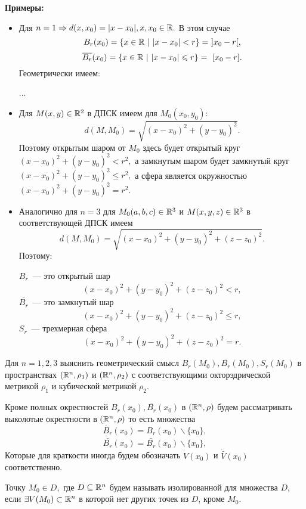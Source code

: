 \documentclass[../main.tex]{subfiles}
\begin{document}
	\textbf{Примеры:}
	\begin{itemize}
	\item Для $n = 1 \Rightarrow d(x, x_0) = |x - x_0|, x, x_0 \in \mathbb{R}.$ В этом случае 
	$$
		B_r(x_0) = \{x \in \mathbb{R}\ |\ |x - x_0| < r\} =\ ] x_0 - r [,
	$$
	$$
		\overline{B_r}(x_0) = \{x \in \mathbb{R}\ |\ |x - x_0| \leqslant r\} =\ [ x_0 - r ].
	$$
	Геометрически имеем:
	
	...
	
	\item  Для $M(x, y) \in \mathbb{R}^2$ в ДПСК имеем для $M_0(x_0, y_0)$:
	$$
		d(M, M_0) = \sqrt{(x - x_0)^2 + (y - y_0)^2}.
	$$
	Поэтому открытым шаром от $M_0$ здесь будет открытый круг 
	$
		(x - x_0)^2 + (y - y_0)^2 < r^2,
	$ 
	а замкнутым шаром будет замкнутый круг 
	$
		(x - x_0)^2 + (y - y_0)^2 \leqslant r^2,
	$ 
	а сфера является окружностью 
	$
		(x - x_0)^2 + (y - y_0)^2 = r^2.
	$ 
	
	\item Аналогично для $n = 3$ для $M_0(a, b, c) \in \mathbb{R}^3$ и $M(x, y, z) \in \mathbb{R}^3$ в соответствующей ДПСК имеем  
	$$
		d(M, M_0) = \sqrt{(x - x_0)^2 + (y - y_0)^2 + (z - z_0)^2}.
	$$
	Поэтому:
	
	$B_r$~--- это открытый шар
	$$
		(x - x_0)^2 + (y - y_0)^2 + (z - z_0)^2 < r,
	$$
	$\overline{B_r}$~--- это замкнутый шар
	$$
	(x - x_0)^2 + (y - y_0)^2 + (z - z_0)^2 \leqslant r,
	$$	
	$S_r$~--- трехмерная сфера
	$$
	(x - x_0)^2 + (y - y_0)^2 + (z - z_0)^2 = r.
	$$
	\end{itemize}
	\begin{exc}
		Для $n = 1, 2, 3$  выяснить геометрический смысл $B_r(M_0), \overline{B_r}(M_0),  S_r(M_0)$ в пространствах $(\mathbb{R}^n, \rho_1)$ и $(\mathbb{R}^n, \rho_2)$  с соответствующими окторэдрической метрикой $\rho_1$ и кубической метрикой $\rho_2$. 
	\end{exc}
	\begin{rem}
		Кроме полных окрестностей $B_r(x_0), \overline{B_r}(x_0)$ в $(\mathbb{R}^n, \rho)$ будем рассматривать выколотые окрестности в $(\mathbb{R}^n, \rho)$ то есть множества
		$$
			\dot{B_r}(x_0) = B_r(x_0) \backslash \{x_0\},
		$$
		$$
			\dot{\bar{B_r}}(x_0) = \bar{B_r}(x_0) \backslash \{x_0\},
		$$
		Которые для краткости иногда будем обозначать $\dot{V}(x_0) $ и $\dot{\bar{V}}(x_0)$ соответственно. 
	\end{rem}
	\smallskip
	
	Точку $M_0 \in D,$ где $D \subseteq \mathbb{R}^n$ будем называть изолированной для множества $D$, если $\exists V(M_0) \subset \mathbb{R}^n$ в которой нет других точек из $D$, кроме $M_0$.
	
\end{document}
